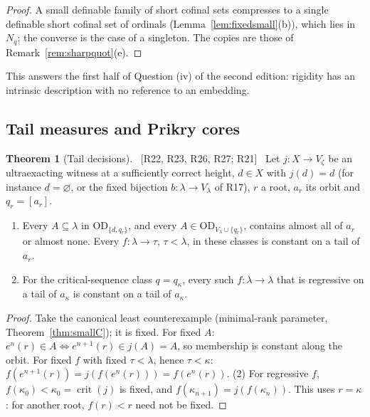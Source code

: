 \documentclass[11pt,letterpaper]{article}
\theoremstyle{definition}
\newtheorem{theorem}[definition]{Theorem}
\numberwithin{equation}{section}
\newcommand{\OD}{\mathrm{OD}}
\newcommand{\crit}{\operatorname{crit}}
\newcommand{\src}[1]{\unskip\ {\normalfont\small\sffamily\color{Olive}[#1]}\ }
\newcommand{\R}[1]{\textsf{R#1}}
\begin{document}
\begin{proof}
A small definable family of short cofinal sets compresses to a single definable short cofinal set of ordinals (Lemma~\ref{lem:fixedsmall}(b)), which lies in $N_q$; the converse is the case of a singleton. The copies are those of Remark~\ref{rem:sharpquot}(e).
\end{proof}

This answers the first half of Question (iv) of the second edition: rigidity has an intrinsic description with no reference to an embedding.

\subsection{Tail measures and Prikry cores}

\begin{theorem}[Tail decisions]\label{thm:taildec}\src{R22, R23, R26, R27; R21}
Let $j:X\to V_\zeta$ be an ultraexacting witness at a sufficiently correct height, $d\in X$ with $j(d)=d$ (for instance $d=\varnothing$, or the fixed bijection $b:\lambda\to V_\lambda$ of \R{17}), $r$ a root, $a_r$ its orbit and $q_r=[a_r]$.
\begin{enumerate}
\item Every $A\subseteq\lambda$ in $\OD_{\{d,q_r\}}$, and every $A\in\OD_{V_\lambda\cup\{q_r\}}$, contains almost all of $a_r$ or almost none. Every $f:\lambda\to\tau$, $\tau<\lambda$, in these classes is constant on a tail of $a_r$.
\item For the critical-sequence class $q=q_\kappa$, every such $f:\lambda\to\lambda$ that is regressive on a tail of $a_\kappa$ is constant on a tail of $a_\kappa$.
\end{enumerate}
\end{theorem}

\begin{proof}
Take the canonical least counterexample (minimal-rank parameter, Theorem~\ref{thm:smallC}); it is fixed. For fixed $A$: $e^n(r)\in A\iff e^{n+1}(r)\in j(A)=A$, so membership is constant along the orbit. For fixed $f$ with fixed $\tau<\lambda$, hence $\tau<\kappa$: $f(e^{n+1}(r))=j(f(e^n(r)))=f(e^n(r))$. (2) For regressive $f$, $f(\kappa_0)<\kappa_0=\crit(j)$ is fixed, and $f(\kappa_{n+1})=j(f(\kappa_n))$. This uses $r=\kappa$: for another root, $f(r)<r$ need not be fixed.
\end{proof}
\end{document}
